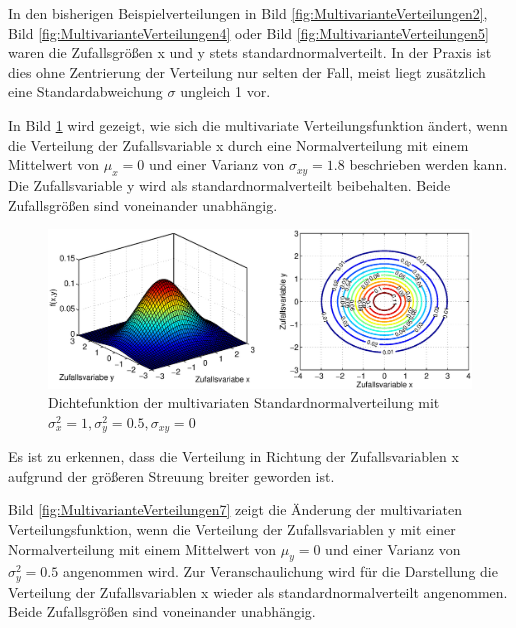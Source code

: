 \noindent In den bisherigen Beispielverteilungen in Bild \ref{fig:MultivarianteVerteilungen2}, Bild \ref{fig:MultivarianteVerteilungen4} oder Bild \ref{fig:MultivarianteVerteilungen5} waren die Zufallsgr\"{o}{\ss}en x und y stets standardnormalverteilt. In der Praxis ist dies ohne Zentrierung der Verteilung nur selten der Fall, meist liegt zus\"{a}tzlich eine Standardabweichung $\sigma$ ungleich 1 vor.\newline

\noindent In Bild \ref{fig:MultivarianteVerteilungen6} wird gezeigt, wie sich die multivariate Verteilungsfunktion \"{a}ndert, wenn die Verteilung der Zufallsvariable x durch eine Normalverteilung mit einem Mittelwert von $\mu_{x} = 0$ und einer Varianz von $\sigma_{xy} = 1.8$ beschrieben werden kann. Die Zufallsvariable y wird als standardnormalverteilt beibehalten. Beide Zufallsgr\"{o}{\ss}en sind voneinander unabh\"{a}ngig.

\clearpage

\noindent 
\begin{figure}[H]
  \centerline{\includegraphics[width=1\textwidth]{Kapitel8/Bilder/image15}}
  \caption{ Dichtefunktion der multivariaten Standardnormalverteilung mit $\sigma_{x}^{2} = 1, \sigma_{y}^{2} = 0.5, \sigma_{xy} = 0$}
  \label{fig:MultivarianteVerteilungen6}
\end{figure}

\noindent Es ist zu erkennen, dass die Verteilung in Richtung der Zufallsvariablen x aufgrund der gr\"{o}{\ss}eren Streuung breiter geworden ist. 

\noindent Bild \ref{fig:MultivarianteVerteilungen7} zeigt die \"{A}nderung der multivariaten Verteilungsfunktion, wenn die Verteilung der Zufallsvariablen y mit einer Normalverteilung mit einem Mittelwert von $\mu_{y} = 0$ und einer Varianz von $\sigma_{y}^{2} = 0.5$ angenommen wird. Zur Veranschaulichung wird f\"{u}r die Darstellung die Verteilung der Zufallsvariablen x wieder als standardnormalverteilt angenommen. Beide Zufallsgr\"{o}{\ss}en sind voneinander unabh\"{a}ngig.

